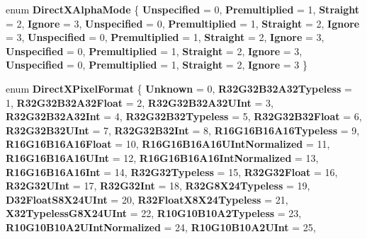 \begin{DoxyCompactItemize}
enum {\bfseries Direct\+X\+Alpha\+Mode} \{ \newline
{\bfseries Unspecified} = 0, 
{\bfseries Premultiplied} = 1, 
{\bfseries Straight} = 2, 
{\bfseries Ignore} = 3, 
\newline
{\bfseries Unspecified} = 0, 
{\bfseries Premultiplied} = 1, 
{\bfseries Straight} = 2, 
{\bfseries Ignore} = 3, 
\newline
{\bfseries Unspecified} = 0, 
{\bfseries Premultiplied} = 1, 
{\bfseries Straight} = 2, 
{\bfseries Ignore} = 3, 
\newline
{\bfseries Unspecified} = 0, 
{\bfseries Premultiplied} = 1, 
{\bfseries Straight} = 2, 
{\bfseries Ignore} = 3, 
\newline
{\bfseries Unspecified} = 0, 
{\bfseries Premultiplied} = 1, 
{\bfseries Straight} = 2, 
{\bfseries Ignore} = 3
 \}
\item 
\mbox{\label{namespace_windows_1_1_graphics_1_1_direct_x_a842a48af0a06e5cee12c38f8c99fbdce}} 
enum {\bfseries Direct\+X\+Pixel\+Format} \{ \newline
{\bfseries Unknown} = 0, 
{\bfseries R32\+G32\+B32\+A32\+Typeless} = 1, 
{\bfseries R32\+G32\+B32\+A32\+Float} = 2, 
{\bfseries R32\+G32\+B32\+A32\+U\+Int} = 3, 
\newline
{\bfseries R32\+G32\+B32\+A32\+Int} = 4, 
{\bfseries R32\+G32\+B32\+Typeless} = 5, 
{\bfseries R32\+G32\+B32\+Float} = 6, 
{\bfseries R32\+G32\+B32\+U\+Int} = 7, 
\newline
{\bfseries R32\+G32\+B32\+Int} = 8, 
{\bfseries R16\+G16\+B16\+A16\+Typeless} = 9, 
{\bfseries R16\+G16\+B16\+A16\+Float} = 10, 
{\bfseries R16\+G16\+B16\+A16\+U\+Int\+Normalized} = 11, 
\newline
{\bfseries R16\+G16\+B16\+A16\+U\+Int} = 12, 
{\bfseries R16\+G16\+B16\+A16\+Int\+Normalized} = 13, 
{\bfseries R16\+G16\+B16\+A16\+Int} = 14, 
{\bfseries R32\+G32\+Typeless} = 15, 
\newline
{\bfseries R32\+G32\+Float} = 16, 
{\bfseries R32\+G32\+U\+Int} = 17, 
{\bfseries R32\+G32\+Int} = 18, 
{\bfseries R32\+G8\+X24\+Typeless} = 19, 
\newline
{\bfseries D32\+Float\+S8\+X24\+U\+Int} = 20, 
{\bfseries R32\+Float\+X8\+X24\+Typeless} = 21, 
{\bfseries X32\+Typeless\+G8\+X24\+U\+Int} = 22, 
{\bfseries R10\+G10\+B10\+A2\+Typeless} = 23, 
\newline
{\bfseries R10\+G10\+B10\+A2\+U\+Int\+Normalized} = 24, 
{\bfseries R10\+G10\+B10\+A2\+U\+Int} = 25, 

\end{DoxyCompactItemize}

